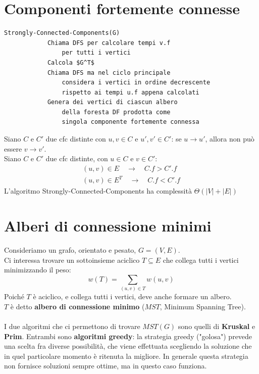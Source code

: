 \section{Componenti fortemente connesse}
    \begin{lstlisting}[caption=Strongly Connected Components]
        Strongly-Connected-Components(G)
            Chiama DFS per calcolare tempi v.f 
                per tutti i vertici
            Calcola $G^T$
            Chiama DFS ma nel ciclo principale
                considera i vertici in ordine decrescente
                rispetto ai tempi u.f appena calcolati
            Genera dei vertici di ciascun albero
                della foresta DF prodotta come 
                singola componente fortemente connessa
    \end{lstlisting}
Siano $C$ e $C'$ due cfc distinte con $u, v \in C$ e $u', v' \in C'$: se $u \rightarrow u'$, allora non può essere $v \rightarrow v'$.\\
Siano $C$ e $C'$ due cfc distinte, con $u \in C$ e $v \in C'$:
    \begin{equation}\begin{aligned}
        (u, v) \in E \quad \rightarrow \quad C.f > C'.f\\
        (u, v) \in E^T \quad \rightarrow \quad C.f < C'.f
    \end{aligned}\end{equation}
L'algoritmo Strongly-Connected-Components ha complessità $\Theta(|V|+|E|)$

\section{Alberi di connessione minimi}
Consideriamo un grafo, orientato e pesato, $G = (V, E)$.\\
Ci interessa trovare un sottoinsieme aciclico $T \subseteq E$ che collega tutti i vertici minimizzando il peso:
    \begin{equation}
        w(T) = \sum_{(u,v) \in T} {w(u,v)}
    \end{equation}
Poiché $T$ è aciclico, e collega tutti i vertici, deve anche formare un albero.\\
$T$ è detto \textbf{albero di connessione minimo} ($MST$, Minimum Spanning Tree).\\\\
I due algoritmi che ci permettono di trovare $MST(G)$ sono quelli di \textbf{Kruskal} e \textbf{Prim}. Entrambi sono \textbf{algoritmi greedy}: la strategia greedy ("golosa") prevede una scelta fra diverse possibilità, che viene effettuata scegliendo la soluzione che in quel particolare momento è ritenuta la migliore. In generale questa strategia non fornisce soluzioni sempre ottime, ma in questo caso funziona.

